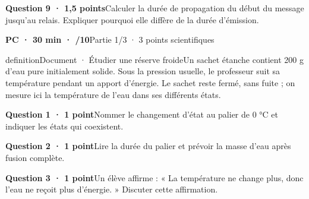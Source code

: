 \par\addvspace{3mm}\noindent\begin{minipage}{\linewidth}\textbf{Question 9 · 1,5 points}\quad Calculer la durée de propagation du début du message jusqu’au relais. Expliquer pourquoi elle diffère de la durée d’émission.\par\end{minipage}\par
\vfill{}
\label{ann-14}
\textbf{PC · 30 min · /10}\hfill Partie 1/3 · 3 points scientifiques
\begin{pcEncadre}{definition}{Document · Étudier une réserve froide}Un sachet étanche contient 200 g d’eau pure initialement solide. Sous la pression usuelle, le professeur suit sa température pendant un apport d’énergie. Le sachet reste fermé, sans fuite ; on mesure ici la température de l’eau dans ses différents états.\end{pcEncadre}
\par\addvspace{3mm}\noindent\begin{minipage}{\linewidth}\textbf{Question 1 · 1 point}\quad Nommer le changement d’état au palier de 0 °C et indiquer les états qui coexistent.\par\end{minipage}\par
\par\addvspace{3mm}\noindent\begin{minipage}{\linewidth}\textbf{Question 2 · 1 point}\quad Lire la durée du palier et prévoir la masse d’eau après fusion complète.\par\end{minipage}\par
\par\addvspace{3mm}\noindent\begin{minipage}{\linewidth}\textbf{Question 3 · 1 point}\quad Un élève affirme : « La température ne change plus, donc l’eau ne reçoit plus d’énergie. » Discuter cette affirmation.\par\end{minipage}\par
\vfill{}
